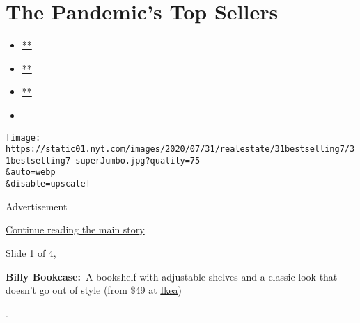 \hypertarget{the-pandemics-top-sellers}{%
\section{The Pandemic's Top Sellers}\label{the-pandemics-top-sellers}}

\begin{itemize}
\item
  \href{https://www.facebook.com/sharer.php?app_id=9869919170\&u=https\%3A\%2F\%2Fwww.nytimes.com\%2Fslideshow\%2F2020\%2F07\%2F31\%2Frealestate\%2Fthe-pandemics-top-sellers.html\%3Fsmid\%3Dfb-share\&name=The\%20Pandemic\%E2\%80\%99s\%20Top\%20Sellers\&redirect_uri=https\%3A\%2F\%2Fwww.facebook.com\%2F}{**}
\item
  \href{https://twitter.com/intent/tweet?url=https\%3A\%2F\%2Fwww.nytimes.com\%2Fslideshow\%2F2020\%2F07\%2F31\%2Frealestate\%2Fthe-pandemics-top-sellers.html\%3Fsmid\%3Dtw-share\&text=The\%20Pandemic\%E2\%80\%99s\%20Top\%20Sellers}{**}
\item
  \href{mailto:?subject=NYTimes.com\%3A\%20The\%20Pandemic\%E2\%80\%99s\%20Top\%20Sellers\&body=From\%20The\%20New\%20York\%20Times\%3A\%0A\%0AThe\%20Pandemic\%E2\%80\%99s\%20Top\%20Sellers\%0A\%0AAs\%20we\%20shelter\%20in\%20place\%2C\%20the\%20things\%20we\%E2\%80\%99ve\%20been\%20buying\%20for\%20our\%20homes\%20have\%20shifted\%20a\%20bit.\%0A\%0Ahttps\%3A\%2F\%2Fwww.nytimes.com\%2Fslideshow\%2F2020\%2F07\%2F31\%2Frealestate\%2Fthe-pandemics-top-sellers.html\%3Fsmid\%3Dem-share}{**}
\item
\end{itemize}

\texttt{[image: https://static01.nyt.com/images/2020/07/31/realestate/31bestselling7/31bestselling7-superJumbo.jpg?quality=75\\\&auto=webp\\\&disable=upscale]}

Advertisement

\protect\hyperlink{after-right-0}{Continue reading the main story}

Slide 1 of 4,

\textbf{Billy Bookcase:}~A bookshelf with adjustable shelves and a
classic look that doesn't go out of style (from \$49 at
\href{https://www.ikea.com/us/en/p/billy-bookcase-white-00263850/}{Ikea})~~

.

